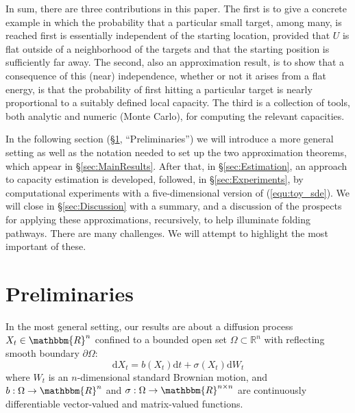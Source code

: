 \documentclass[nofootinbib,english, aip, jcp, priprint, graphicx,floatfix]{revtex4-1}
\theoremstyle{plain}
\theoremstyle{definition}
\theoremstyle{plain}
\begin{document}
In sum, there are three contributions in this paper. The first 
is to give a concrete example in which the probability that a particular small
target, among many, is reached first is essentially independent of the starting location, provided that $U$ is flat outside of a neighborhood of the targets and that the starting position is sufficiently far away. The second, also an approximation result, is to show that a consequence of this (near) independence, whether or not it arises from a flat energy, is that the probability of first hitting a particular target is nearly proportional to a suitably defined local capacity.  
The third is a collection of tools, both analytic and numeric (Monte Carlo), for computing the relevant capacities.

In the following section (\S\ref{sec:Preliminaries}, ``Preliminaries'') we will introduce a more general setting as well as the notation needed to set up the two approximation theorems, which appear in \S\ref{sec:MainResults}.
After that, in \S\ref{sec:Estimation}, an approach to capacity estimation is developed, followed, in  \S\ref{sec:Experiments}, by computational experiments with a five-dimensional version of (\ref{equ:toy_sde}). We will close in \S\ref{sec:Discussion} with a summary, and a discussion of the prospects for 
applying these approximations, recursively, to help illuminate folding pathways. There are many challenges. We will attempt to 
highlight the most important of these.

\section{Preliminaries}
\label{sec:Preliminaries}

In the most general setting, our results are about a diffusion process $X_t\in\mathbbm{R}^n$ confined to a bounded open set $\Omega \subset \mathbb{R}^n$ with reflecting smooth boundary $\partial\Omega$: 
\begin{equation}\label{equ:general_sde}\mathrm{d} X_t = b (X_t) \mathrm{d} t + \sigma (X_t) \mathrm{d} W_t \end{equation}
where $W_t$ is an $n$-dimensional standard Brownian motion, and $b: \Omega \rightarrow \mathbbm{R}^n$ and $\sigma :
\Omega \rightarrow \mathbbm{R}^{n \times n}$ are continuously differentiable vector-valued and matrix-valued functions. 
\end{document}
